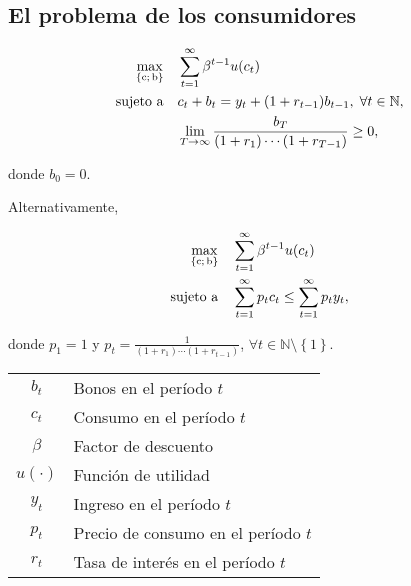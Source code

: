 \documentclass[8pt,a4paper]{extarticle}
\begin{document}
\begin{multicols}{3}
	\sectionbreak

	\subsection{El problema de los consumidores}

	\begin{align*}
		\max_{\left\{ \mathrm{c};\, \mathrm{b} \right\}} \quad & \sum_{t = 1}^{\infty} \beta^{t-1} u(c_t)                              \\
		\textnormal{sujeto a} \quad                            & c_t + b_t = y_t + (1 + r_{t-1}) b_{t-1},\; \forall t \in \mathbb{N},  \\
		                                                       & \lim_{T \to \infty} \frac{b_T}{(1 + r_1)\cdots(1 + r_{T -1})} \geq 0,
	\end{align*}

	donde $b_0 = 0$.

	Alternativamente,

	\begin{align*}
		\max_{\left\{ \mathrm{c};\, \mathrm{b} \right\}} \quad & \sum_{t = 1}^{\infty} \beta^{t-1} u(c_t)                          \\
		\textnormal{sujeto a} \quad                            & \sum_{t = 1}^{\infty} p_t c_t \leq \sum_{t = 1}^{\infty} p_t y_t,
	\end{align*}

	donde $p_1 = 1$ y $\displaystyle p_t = \frac{1}{(1 + r_1) \cdots (1 + r_{t - 1})}$, $\forall t \in \mathbb{N} \setminus \left\{ 1 \right\}$.

	\begin{center}
		\begin{tabular}{ c l }
			\hline
			$b_t$      & Bonos en el período $t$             \\
			$c_t$      & Consumo en el período $t$           \\
			$\beta$    & Factor de descuento                 \\
			$u(\cdot)$ & Función de utilidad                 \\
			$y_t$      & Ingreso en el período $t$           \\
			$p_t$      & Precio de consumo en el período $t$ \\
			$r_t$      & Tasa de interés en el período $t$   \\
			\hline
		\end{tabular}
	\end{center}


\end{multicols}
\end{document}
